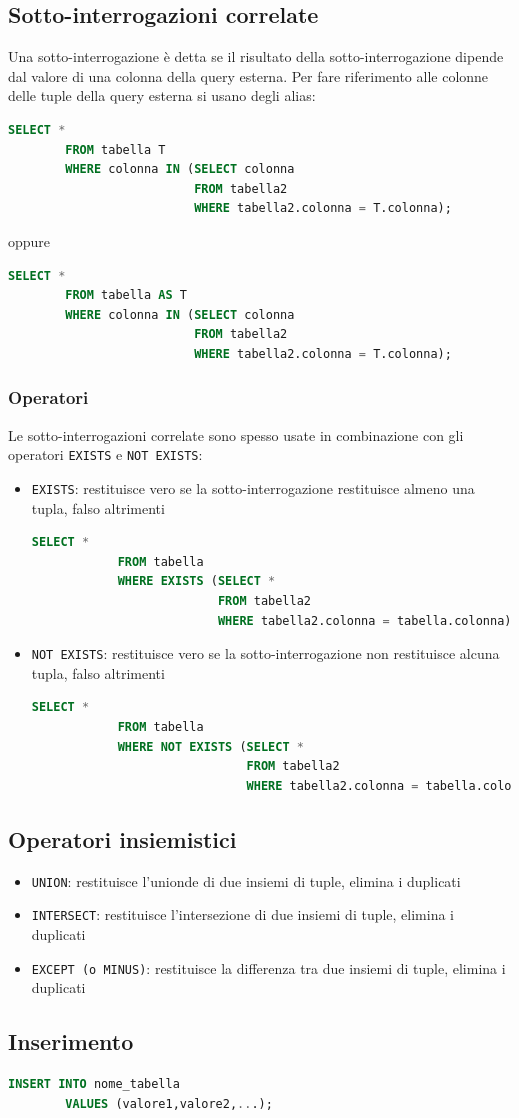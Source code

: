 \documentclass[12pt, a4paper]{report}
\begin{document}
    \subsection{Sotto-interrogazioni correlate}
    Una sotto-interrogazione è detta  se il risultato della sotto-interrogazione dipende dal valore di una colonna della query esterna. Per fare riferimento alle colonne delle tuple della query esterna si usano degli alias:
    \begin{lstlisting}[language=SQL]
        SELECT *
        FROM tabella T
        WHERE colonna IN (SELECT colonna
                          FROM tabella2
                          WHERE tabella2.colonna = T.colonna);
    \end{lstlisting}
    oppure
    \begin{lstlisting}[language=SQL]
        SELECT *
        FROM tabella AS T
        WHERE colonna IN (SELECT colonna
                          FROM tabella2
                          WHERE tabella2.colonna = T.colonna);
    \end{lstlisting}
    \subsubsection{Operatori}
    Le sotto-interrogazioni correlate sono spesso usate in combinazione con gli operatori \texttt{EXISTS} e \texttt{NOT EXISTS}:
    \begin{itemize}
        \item \texttt{EXISTS}: restituisce vero se la sotto-interrogazione restituisce almeno una tupla, falso altrimenti \begin{lstlisting}[language=SQL]
            SELECT *
            FROM tabella
            WHERE EXISTS (SELECT *
                          FROM tabella2
                          WHERE tabella2.colonna = tabella.colonna);
        \end{lstlisting}
        \item \texttt{NOT EXISTS}: restituisce vero se la sotto-interrogazione non restituisce alcuna tupla, falso altrimenti \begin{lstlisting}[language=SQL]
            SELECT *
            FROM tabella
            WHERE NOT EXISTS (SELECT *
                              FROM tabella2
                              WHERE tabella2.colonna = tabella.colonna);
        \end{lstlisting}
    \end{itemize}
    \subsection{Operatori insiemistici}
    \begin{itemize}
        \item \texttt{UNION}: restituisce l'unionde di due insiemi di tuple, elimina i duplicati
        \item \texttt{INTERSECT}: restituisce l'intersezione di due insiemi di tuple, elimina i duplicati
        \item \texttt{EXCEPT (o MINUS)}: restituisce la differenza tra due insiemi di tuple, elimina i duplicati
    \end{itemize}
    \subsection{Inserimento}
    \begin{lstlisting}[language=SQL]
        INSERT INTO nome_tabella
        VALUES (valore1,valore2,...);
    \end{lstlisting}
\end{document}
